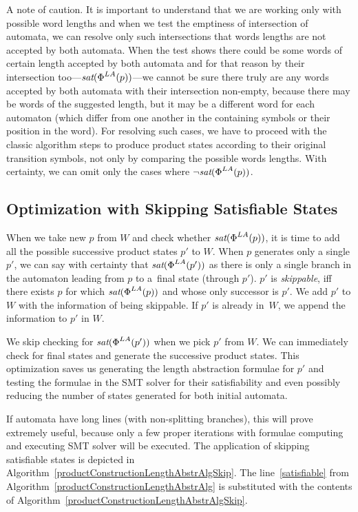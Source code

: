 A note of caution. It is important to understand that we are working only with possible word lengths and when we test the emptiness of intersection of automata, we can resolve only such intersections that words lengths are not accepted by both automata. When the test shows there could be some words of certain length accepted by both automata and for that reason by their intersection too---$\emph{sat}(\emph{$\Phi$}^{LA}(p))$---we cannot be sure there truly are any words accepted by both automata with their intersection non-empty, because there may be words of the suggested length, but it may be a different word for each automaton (which differ from one another in the containing symbols or their position in the word). For resolving such cases, we have to proceed with the classic algorithm steps to produce product states according to their original transition symbols, not only by comparing the possible words lengths. With certainty, we can omit only the cases where $\neg \emph{sat}(\emph{$\Phi$}^{LA}(p))$.


\subsection{Optimization with Skipping Satisfiable States} \label{sec:skipping states}

When we take new $p$ from $W$ and check whether $\emph{sat}(\emph{$\Phi$}^{LA}(p))$, it is time to add all the possible successive product states $p'$ to $W$. When $p$ generates only a single $p'$, we can say with certainty that $\emph{sat}(\emph{$\Phi$}^{LA}(p'))$ as there is only a single branch in the automaton leading from $p$ to a~final state (through $p'$). $p'$ is \emph{skippable}, iff there exists $p$ for which $\emph{sat}(\emph{$\Phi$}^{LA}(p))$ and whose only successor is $p'$. We add $p'$ to $W$ with the information of being skippable. If $p'$ is already in~$W$, we append the information to $p'$ in $W$.

We skip checking for $\emph{sat}(\emph{$\Phi$}^{LA}(p'))$ when we pick $p'$ from $W$. We can immediately check for final states and generate the successive product states. This optimization saves us generating the length abstraction formulae for $p'$ and testing the formulae in the SMT solver for their satisfiability and even possibly reducing the number of states generated for both initial automata.

If automata have long lines (with non-splitting branches), this will prove extremely useful, because only a few proper iterations with formulae computing and executing SMT solver will be executed. The application of skipping satisfiable states is depicted in Algorithm~\ref{productConstructionLengthAbstrAlgSkip}. The line~\ref{satisfiable} from Algorithm~\ref{productConstructionLengthAbstrAlg} is substituted with the contents of Algorithm~\ref{productConstructionLengthAbstrAlgSkip}.

